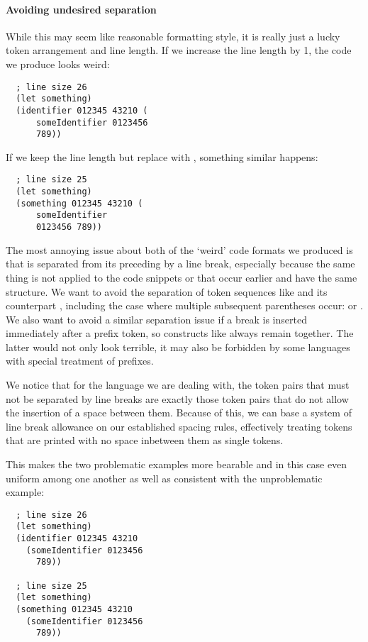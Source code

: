 \paragraph{Avoiding undesired separation}
While this may seem like reasonable formatting style,
it is really just a lucky token arrangement and line length.
If we increase the line length by 1, the code we produce looks weird:
\begin{verbatim}
  ; line size 26
  (let something)
  (identifier 012345 43210 (
      someIdentifier 0123456
      789))
\end{verbatim}
If we keep the line length but replace 
with , something similar happens:
\begin{verbatim}
  ; line size 25
  (let something)
  (something 012345 43210 (
      someIdentifier
      0123456 789))
\end{verbatim}

The most annoying issue about both of the `weird' code formats we produced is that
 is separated from its preceding  by a line break,
especially because the same thing is not applied to the code snippets
 or  that occur earlier and have the same structure.
We want to avoid the separation of token sequences like 
and its counterpart , including the case where multiple subsequent
parentheses occur:  or .
We also want to avoid a similar separation issue if a break
is inserted immediately after a prefix token,
so constructs like  always remain together.
The latter would not only look terrible, it may also be forbidden by some languages
with special treatment of prefixes.

We notice that for the language we are dealing with,
the token pairs that must not be separated by line breaks
are exactly those token pairs that do not allow the insertion of a space between them.
Because of this, we can base a system of line break allowance on our established spacing rules,
effectively treating tokens that are printed with no space inbetween them as single tokens.

This makes the two problematic examples more bearable
and in this case even uniform among one another
as well as consistent with the unproblematic example:
\begin{verbatim}
  ; line size 26
  (let something)
  (identifier 012345 43210
    (someIdentifier 0123456
      789))

  ; line size 25
  (let something)
  (something 012345 43210
    (someIdentifier 0123456
      789))
\end{verbatim}
